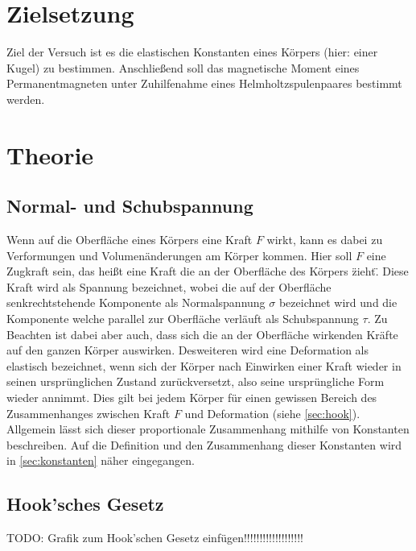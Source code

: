 \section{Zielsetzung}
Ziel der Versuch ist es die elastischen Konstanten eines Körpers (hier: einer Kugel) zu bestimmen. Anschließend soll das magnetische
Moment eines Permanentmagneten unter Zuhilfenahme eines Helmholtzspulenpaares bestimmt werden.
\section{Theorie}
\label{sec:Theorie}
    \subsection{Normal- und Schubspannung}
    Wenn auf die Oberfläche eines Körpers eine Kraft $F$ wirkt, kann es dabei zu Verformungen und Volumenänderungen am Körper
    kommen. Hier soll $F$ eine Zugkraft sein, das heißt eine Kraft die an der Oberfläche des Körpers \"zieht\". Diese Kraft wird
    als Spannung bezeichnet, wobei die auf der Oberfläche senkrechtstehende Komponente als Normalspannung $\sigma$ bezeichnet wird
    und die Komponente welche parallel zur Oberfläche verläuft als Schubspannung $\tau$.
    Zu Beachten ist dabei aber auch, dass sich die an der Oberfläche wirkenden Kräfte auf den ganzen Körper auswirken.
    Desweiteren wird eine Deformation als elastisch bezeichnet, wenn sich der Körper nach Einwirken einer Kraft wieder in seinen
    ursprünglichen Zustand zurückversetzt, also seine ursprüngliche Form wieder annimmt. Dies gilt bei jedem Körper für einen 
    gewissen Bereich des Zusammenhanges zwischen Kraft $F$ und Deformation (siehe \autoref{sec:hook}). Allgemein lässt sich dieser 
    proportionale Zusammenhang mithilfe von Konstanten beschreiben. Auf die Definition und den Zusammenhang dieser Konstanten wird 
    in \autoref{sec:konstanten} näher eingegangen.
    \subsection{Hook'sches Gesetz}
    \label{sec:hook}
    TODO: Grafik zum Hook'schen Gesetz einfügen!!!!!!!!!!!!!!!!!!!

